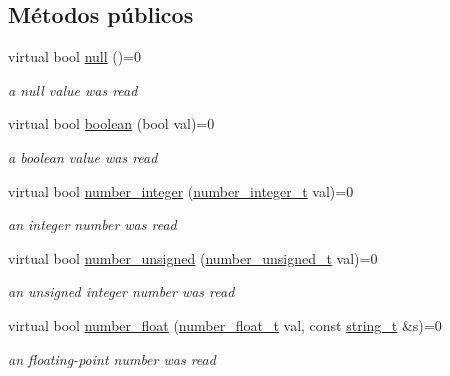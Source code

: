 \subsection*{Métodos públicos}
\begin{DoxyCompactItemize}
\item 
virtual bool \mbox{\hyperlink{structnlohmann_1_1json__sax_a0ad26edef3f8d530dcec3192bba82df6}{null}} ()=0
\begin{DoxyCompactList}\small\item\em a null value was read \end{DoxyCompactList}\item 
virtual bool \mbox{\hyperlink{structnlohmann_1_1json__sax_a82ed080814fa656191a537284bb0c575}{boolean}} (bool val)=0
\begin{DoxyCompactList}\small\item\em a boolean value was read \end{DoxyCompactList}\item 
virtual bool \mbox{\hyperlink{structnlohmann_1_1json__sax_affa7a78b8e9cc9cc3ac99927143142a5}{number\+\_\+integer}} (\mbox{\hyperlink{structnlohmann_1_1json__sax_a0cef30121f02b7fee85e9708148ea0aa}{number\+\_\+integer\+\_\+t}} val)=0
\begin{DoxyCompactList}\small\item\em an integer number was read \end{DoxyCompactList}\item 
virtual bool \mbox{\hyperlink{structnlohmann_1_1json__sax_ad9b253083e0509923ba195136f49face}{number\+\_\+unsigned}} (\mbox{\hyperlink{structnlohmann_1_1json__sax_a32028cc056ae0f43aaae331cdbbbf856}{number\+\_\+unsigned\+\_\+t}} val)=0
\begin{DoxyCompactList}\small\item\em an unsigned integer number was read \end{DoxyCompactList}\item 
virtual bool \mbox{\hyperlink{structnlohmann_1_1json__sax_ae7c31614e8a82164d2d7f8dbf4671b25}{number\+\_\+float}} (\mbox{\hyperlink{structnlohmann_1_1json__sax_a390c209bffd8c4800c8f3076dc465a20}{number\+\_\+float\+\_\+t}} val, const \mbox{\hyperlink{structnlohmann_1_1json__sax_ae01977a9f3c5b3667b7a2929ed91061e}{string\+\_\+t}} \&s)=0
\begin{DoxyCompactList}\small\item\em an floating-\/point number was read \end{DoxyCompactList}\item 

\end{DoxyCompactItemize}
